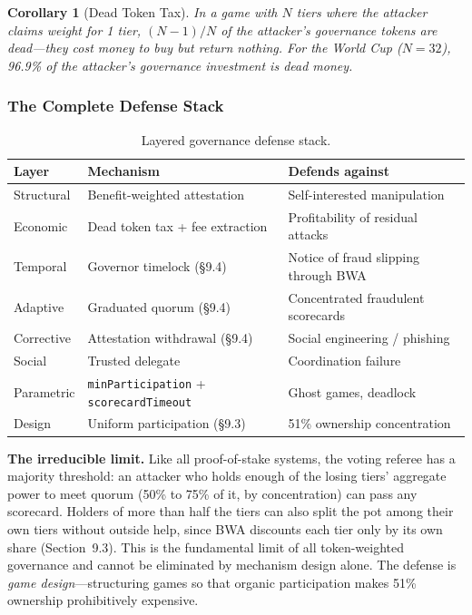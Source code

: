 \documentclass[11pt,a4paper]{article}
\newtheorem{corollary}[theorem]{Corollary}
\begin{document}
\begin{corollary}[Dead Token Tax]
In a game with $N$ tiers where the attacker claims weight for 1 tier, $(N-1)/N$ of the attacker's governance tokens are dead---they cost money to buy but return nothing. For the World Cup ($N = 32$), 96.9\% of the attacker's governance investment is dead money.
\end{corollary}

\subsubsection{The Complete Defense Stack}

\begin{table}[H]
\centering
\begin{tabular}{lll}
\toprule
\textbf{Layer} & \textbf{Mechanism} & \textbf{Defends against} \\
\midrule
Structural & Benefit-weighted attestation & Self-interested manipulation \\
Economic & Dead token tax + fee extraction & Profitability of residual attacks \\
Temporal & Governor timelock (\S9.4) & Notice of fraud slipping through BWA \\
Adaptive & Graduated quorum (\S9.4) & Concentrated fraudulent scorecards \\
Corrective & Attestation withdrawal (\S9.4) & Social engineering / phishing \\
Social & Trusted delegate & Coordination failure \\
Parametric & \texttt{minParticipation} + \texttt{scorecardTimeout} & Ghost games, deadlock \\
Design & Uniform participation (\S9.3) & 51\% ownership concentration \\
\bottomrule
\end{tabular}
\caption{Layered governance defense stack.}
\end{table}

\textbf{The irreducible limit.} Like all proof-of-stake systems, the voting referee has a majority threshold: an attacker who holds enough of the losing tiers' aggregate power to meet quorum (50\% to 75\% of it, by concentration) can pass any scorecard. Holders of more than half the tiers can also split the pot among their own tiers without outside help, since BWA discounts each tier only by its own share (Section~9.3). This is the fundamental limit of all token-weighted governance and cannot be eliminated by mechanism design alone. The defense is \emph{game design}---structuring games so that organic participation makes 51\% ownership prohibitively expensive.
\end{document}
